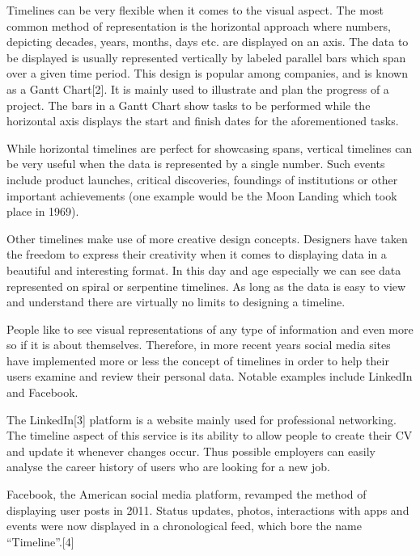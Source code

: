 \documentclass{report}
\begin{document}
Timelines can be very flexible when it comes to the visual aspect. The most common method of representation is the horizontal approach where numbers, depicting decades, years, months, days etc. are displayed on an axis. The data to be displayed is usually represented vertically by labeled parallel bars which span over a given time period. This design is popular among companies, and is known as a Gantt Chart[2]. It is mainly used to illustrate and plan the progress of a project. The bars in a Gantt Chart show tasks to be performed while the horizontal axis displays the start and finish dates for the aforementioned tasks.\par

While horizontal timelines are perfect for showcasing spans, vertical timelines can be very useful when the data is represented by a single number. Such events include product launches, critical discoveries, foundings of institutions or other important achievements (one example would be the Moon Landing which took place in 1969).\par

Other timelines make use of more creative design concepts. Designers have taken the freedom to express their creativity when it comes to displaying data in a beautiful and interesting format. In this day and age especially we can see data represented on spiral or serpentine timelines. As long as the data is easy to view and understand there are virtually no limits to designing a timeline.\par

People like to see visual representations of any type of information and even more so if it is about themselves. Therefore, in more recent years social media sites have implemented more or less the concept of timelines in order to help their users examine and review their personal data. Notable examples include LinkedIn and Facebook. \par

The LinkedIn[3] platform is a website mainly used for professional networking. The timeline aspect of this service is its ability to allow people to create their CV and update it whenever changes occur. Thus possible employers can easily analyse the career history of users who are looking for a new job.\par

Facebook, the American social media platform, revamped the method of displaying user posts in 2011. Status updates, photos, interactions with apps and events were now displayed in a chronological feed, which bore the name “Timeline”.[4]\par
\end{document}
